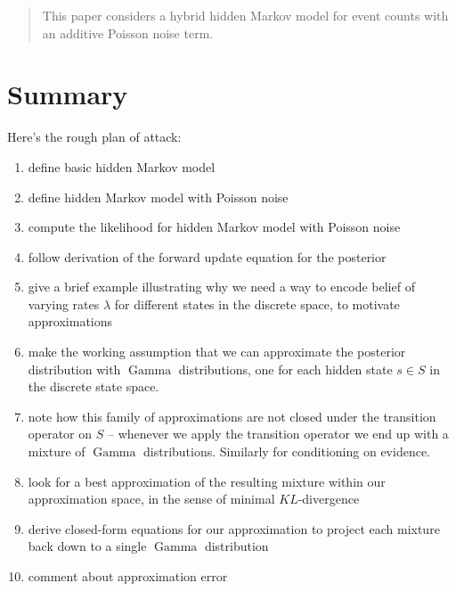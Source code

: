 \documentclass[twoside, 11pt]{article}
\DeclareMathOperator*{\gammad}{Gamma}
\begin{document}


\author{\name Reuben Fletcher-Costin}

\title{}

\maketitle

\begin{abstract}%
This paper considers a hybrid hidden Markov model for event counts with an additive Poisson noise term. 
\end{abstract}

\section{Summary}

Here's the rough plan of attack:
\begin{enumerate}
\item define basic hidden Markov model
\item define hidden Markov model with Poisson noise
\item compute the likelihood for hidden Markov model with Poisson noise
\item follow \citet*{russell2002artificial} derivation of the forward update equation for the posterior
\item give a brief example illustrating why we need a way to encode belief of varying rates $\lambda$ for different states in the discrete space, to motivate approximations
\item make the working assumption that we can approximate the posterior distribution with $\gammad$ distributions, one for each hidden state $s \in S$ in the discrete state space.
\item note how this family of approximations are not closed under the transition operator on $S$ -- whenever we apply the transition operator we end up with a mixture of $\gammad$ distributions. Similarly for conditioning on evidence.
\item look for a best approximation of the resulting mixture within our approximation space, in the sense of minimal $KL$-divergence
\item derive closed-form equations for our approximation to project each mixture back down to a single $\gammad$ distribution
\item comment about approximation error
\end{enumerate}
\end{document}
